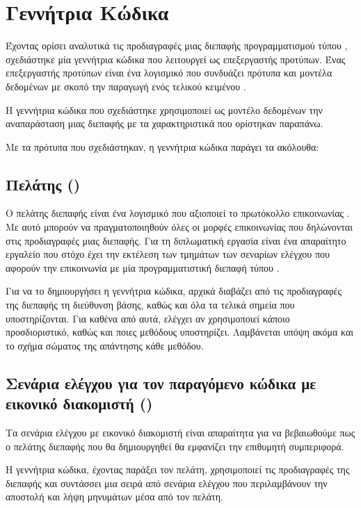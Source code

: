 \section{Γεννήτρια Κώδικα}
Έχοντας ορίσει αναλυτικά τις προδιαγραφές μιας διεπαφής προγραμματισμού τύπου ,
σχεδιάστηκε μία γεννήτρια κώδικα που λειτουργεί ως επεξεργαστής προτύπων.
Ένας επεξεργαστής προτύπων είναι ένα λογισμικό που συνδυάζει πρότυπα και μοντέλα δεδομένων 
με σκοπό την παραγωγή ενός τελικού κειμένου \cite{niemeyer2005learning}.

Η γεννήτρια κώδικα που σχεδιάστηκε χρησιμοποιεί ως μοντέλο δεδομένων την αναπαράσταση μιας διεπαφής
με τα χαρακτηριστικά που ορίστηκαν παραπάνω. 

Με τα πρότυπα που σχεδιάστηκαν,
η γεννήτρια κώδικα παράγει τα ακόλουθα:

\subsection{Πελάτης () }

Ο πελάτης διεπαφής είναι ένα λογισμικό που αξιοποιεί το πρωτόκολλο επικοινωνίας .
Με αυτό μπορούν να πραγματοποιηθούν όλες οι μορφές επικοινωνίας που δηλώνονται στις προδιαγραφές μιας διεπαφής.
Για τη διπλωματική εργασία είναι ένα απαραίτητο εργαλείο 
που στόχο έχει την εκτέλεση των τμημάτων των σεναρίων ελέγχου
που αφορούν την επικοινωνία με μία προγραμματιστική διεπαφή τύπου .

Για να το δημιουργήσει η γεννήτρια κώδικα,
αρχικά διαβάζει από τις προδιαγραφές της διεπαφής τη διεύθυνση βάσης,
καθώς και όλα τα τελικά σημεία που υποστηρίζονται.
Για καθένα από αυτά,
ελέγχει αν χρησιμοποιεί κάποιο προσδιοριστικό, 
καθώς και ποιες μεθόδους υποστηρίζει.
Λαμβάνεται υπόψη ακόμα και το σχήμα σώματος της απάντησης κάθε μεθόδου.  

\subsection{Σενάρια ελέγχου για τον παραγόμενο κώδικα με εικονικό διακομιστή ()}

Τα σενάρια ελέγχου με εικονικό διακομιστή είναι απαραίτητα για να βεβαιωθούμε πως ο πελάτης διεπαφής που θα δημιουργηθεί
θα εμφανίζει την επιθυμητή συμπεριφορά.

Η γεννήτρια κώδικα,
έχοντας παράξει τον πελάτη, 
χρησιμοποιεί τις προδιαγραφές της διεπαφής και
συντάσσει μια σειρά από σενάρια ελέγχου που περιλαμβάνουν την αποστολή και λήψη μηνυμάτων 
μέσα από τον πελάτη. 

